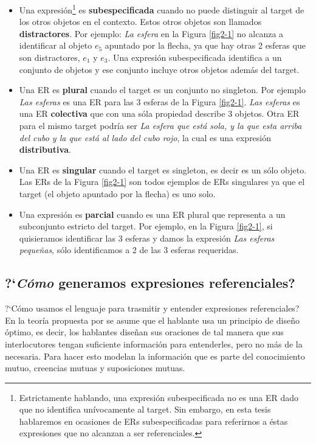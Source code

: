 \begin{itemize}
\item Una expresi\'on\footnote{Estrictamente hablando, una expresi\'on subespecificada no es una ER dado que no identifica un\'ivocamente al target. Sin embargo, en esta tesis hablaremos en ocasiones de ERs subespecificadas para referirnos a \'estas expresiones que no alcanzan a ser referenciales.} es {\bf subespecificada} cuando no puede distinguir al target de los otros objetos en el contexto. Estos otros objetos son llamados \textbf{distractores}. Por ejemplo: {\it La esfera} en la Figura \ref{fig2-1} no alcanza a identificar al objeto $e_5$ apuntado por la flecha, ya que hay otras 2 esferas que son distractores, $e_1$ y $e_3$. Una expresi\'on subespecificada identifica a un conjunto de objetos y ese conjunto incluye otros objetos adem\'as del target.

\item Una ER es {\bf plural} cuando el target es un conjunto no singleton. Por ejemplo {\it Las esferas} es una ER para las 3 esferas de la Figura \ref{fig2-1}. {\it Las esferas} es una ER \textbf{colectiva} que con una s\'ola propiedad describe 3 objetos. Otra ER para el mismo target podr\'ia ser {\it La esfera que est\'a sola, y la que esta arriba del cubo y la que est\'a al lado del cubo rojo}, la cual es una expresi\'on \textbf{distributiva}.

\item Una ER es {\bf singular} cuando el target es singleton, es decir es un s\'olo objeto. Las ERs de la Figura \ref{fig2-1} son todos ejemplos de ERs singulares ya que el target (el objeto apuntado por la flecha) es uno solo. 

\item Una expresi\'on es {\bf parcial} cuando es una ER plural que representa a un subconjunto estricto del target. Por ejemplo, en la Figura \ref{fig2-1}, si quisieramos identificar las 3 esferas y damos la expresi\'on {\it Las esferas peque\~nas}, s\'olo identificamos a 2 de las 3 esferas requeridas.
\end{itemize}

\subsection{?`\emph{C\'omo} generamos expresiones referenciales?}
\label{sec:psicolinguistica}

?`C\'omo usamos el lenguaje para trasmitir y entender expresiones referenciales? En la teor\'ia propuesta por \cite{clark1992arenas} se asume que el hablante usa un principio de dise\~no \'optimo, es decir, los hablantes dise\~nan sus oraciones de tal manera que sus interlocutores tengan suficiente informaci\'on para entenderles, pero no m\'as de la necesaria. Para hacer esto modelan la informaci\'on que es parte del conocimiento mutuo, creencias mutuas y suposiciones mutuas. 

